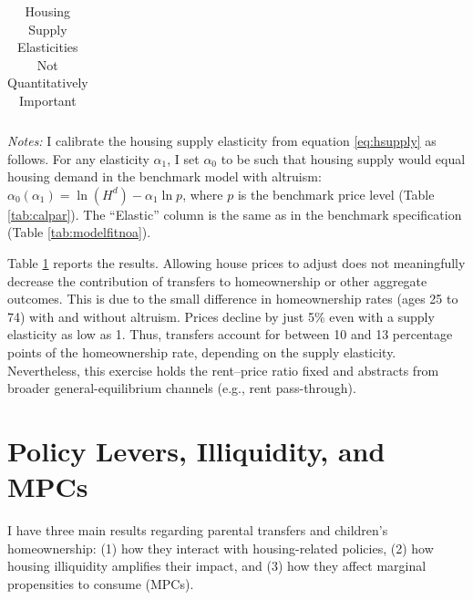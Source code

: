 \documentclass[12pt]{article}
\begin{document}
\begin{table}
	\center 
	\begin{threeparttable}
		\caption{Housing Supply Elasticities Not Quantitatively Important}\label{tab:quant_endogenprices}
		
		\begin{tabular}{@{}llll@{}}
			
		\end{tabular}
		
	\end{threeparttable}
	{\begin{footnotesize}\begin{flushleft}\vspace{-0.1in}%
		\textit{Notes:} I calibrate the housing supply elasticity from equation \eqref{eq:hsupply} as follows. For any elasticity $\alpha_1$, I set $\alpha_0$ to be such that housing supply would equal housing demand in the benchmark model with altruism: $\alpha_0(\alpha_1) = \ln(H^d) - \alpha_1 \ln p$, where $p$ is the benchmark price level (Table \ref{tab:calpar}). The ``Elastic'' column is the same as in the benchmark specification (Table \ref{tab:modelfitnoa}).
	\end{flushleft}\end{footnotesize}}		
\end{table}

Table \ref{tab:quant_endogenprices} reports the results. Allowing house prices to adjust does not meaningfully decrease the contribution of transfers to homeownership or other aggregate outcomes. This is due to the small difference in homeownership rates (ages 25 to 74) with and without altruism. Prices decline by just 5\% even with a supply elasticity as low as 1. Thus, transfers account for between 10 and 13 percentage points of the homeownership rate, depending on the supply elasticity. Nevertheless, this exercise holds the rent–price ratio fixed and abstracts from broader general-equilibrium channels (e.g., rent pass-through).

\section{Policy Levers, Illiquidity, and MPCs}\label{sec:pol}
I have three main results regarding parental transfers and children's homeownership: (1) how they interact with housing-related policies, (2) how housing illiquidity amplifies their impact, and (3) how they affect marginal propensities to consume (MPCs).
\end{document}
